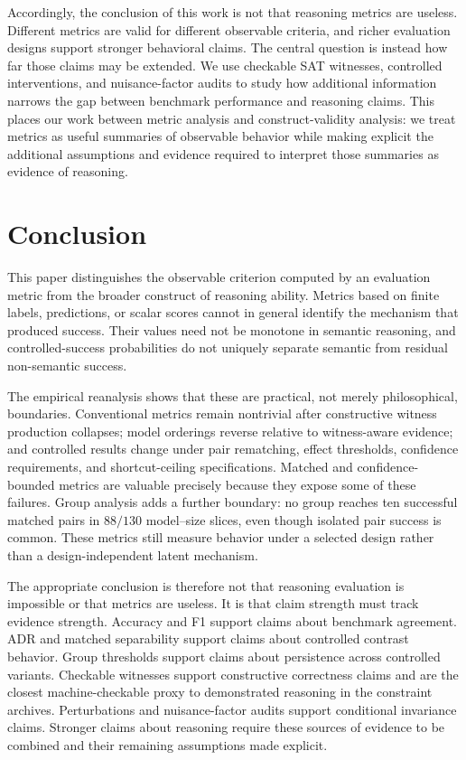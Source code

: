 \documentclass[acmsmall,screen,review,anonymous]{acmart}
\begin{document}
Accordingly, the conclusion of this work is not that reasoning metrics are
useless. Different metrics are valid for different observable criteria, and
richer evaluation designs support stronger behavioral claims. The central
question is instead how far those claims may be extended. We use checkable SAT
witnesses, controlled interventions, and nuisance-factor audits to study how
additional information narrows
the gap between benchmark performance and reasoning claims. This places our
work between metric analysis and construct-validity analysis: we treat
metrics as useful summaries of observable behavior while making explicit the
additional assumptions and evidence required to interpret those summaries as
evidence of reasoning.



\section{Conclusion}
\label{sec:conclusion}

This paper distinguishes the observable criterion computed by an evaluation
metric from the broader construct of reasoning ability. Metrics based on
finite labels, predictions, or scalar scores cannot in general identify the
mechanism that produced success. Their values need not be monotone in
semantic reasoning, and controlled-success probabilities do not uniquely
separate semantic from residual non-semantic success.

The empirical reanalysis shows that these are practical, not merely
philosophical, boundaries. Conventional metrics remain nontrivial after
constructive witness production collapses; model orderings reverse relative
to witness-aware evidence; and controlled results change under pair
rematching, effect thresholds, confidence
requirements, and shortcut-ceiling specifications. Matched and
confidence-bounded metrics are valuable precisely because they expose some of
these failures. Group analysis adds a further boundary: no group reaches ten
successful matched pairs in \(88/130\) model--size slices, even though
isolated pair success is common. These metrics still measure behavior under a
selected design rather than a design-independent latent mechanism.

The appropriate conclusion is therefore not that reasoning evaluation is
impossible or that metrics are useless. It is that claim strength must track
evidence strength. Accuracy and F1 support claims about benchmark agreement.
ADR and matched separability support claims about controlled contrast
behavior. Group thresholds support claims about persistence across controlled
variants. Checkable witnesses support constructive correctness claims and are
the closest machine-checkable proxy to demonstrated reasoning in the
constraint archives. Perturbations and nuisance-factor audits support
conditional invariance claims. Stronger claims about reasoning require these
sources of evidence to be combined and their remaining assumptions made
explicit.




\end{document}
